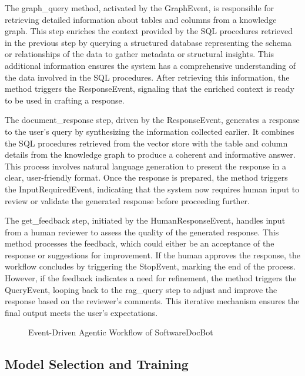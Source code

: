 \documentclass[11pt]{article}
\begin{document}
The graph\_query method, activated by the GraphEvent, is responsible for retrieving detailed information about tables and columns from a knowledge graph. This step enriches the context provided by the SQL procedures retrieved in the previous step by querying a structured database representing the schema or relationships of the data to gather metadata or structural insights. This additional information ensures the system has a comprehensive understanding of the data involved in the SQL procedures. After retrieving this information, the method triggers the ResponseEvent, signaling that the enriched context is ready to be used in crafting a response.

The document\_response step, driven by the ResponseEvent, generates a response to the user’s query by synthesizing the information collected earlier. It combines the SQL procedures retrieved from the vector store with the table and column details from the knowledge graph to produce a coherent and informative answer. This process involves natural language generation to present the response in a clear, user-friendly format. Once the response is prepared, the method triggers the InputRequiredEvent, indicating that the system now requires human input to review or validate the generated response before proceeding further.

The get\_feedback step, initiated by the HumanResponseEvent, handles input from a human reviewer to assess the quality of the generated response. This method processes the feedback, which could either be an acceptance of the response or suggestions for improvement. If the human approves the response, the workflow concludes by triggering the StopEvent, marking the end of the process. However, if the feedback indicates a need for refinement, the method triggers the QueryEvent, looping back to the rag\_query step to adjust and improve the response based on the reviewer’s comments. This iterative mechanism ensures the final output meets the user’s expectations.

\begin{figure*}[h]
\centering
\setlength\fboxrule{1pt}  %
\setlength\fboxsep{0pt}   %
\caption{Event-Driven Agentic Workflow of SoftwareDocBot}
\label{fig:LLM}
\end{figure*}

\subsection{Model Selection and Training}
\end{document}

